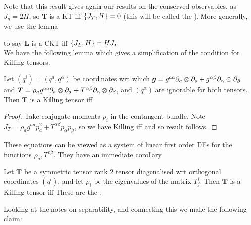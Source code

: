 \documentclass{article}
\begin{document}
Note that this result gives again our results on the conserved observables, as $J_g = 2H$, so $\bm{T}$ is a KT iff $\acomm[J_T]{H} = 0$ (this will be called the ). More generally, we use the lemma 
\begin{lemma}
\end{lemma}
to say $\bm{L}$ is a CKT iff $\acomm[J_L]{H}=  H J_{\bar{L}}$ \\
We have the following lemma which gives a simplification of the condition for Killing tensors.

\begin{lemma}
Let $(q^i) = (q^a, q^\alpha)$ be coordinates wrt which $\bm{g} = g^{aa} \del_a \otimes \del_a + g^{\alpha\beta} \del_\alpha \otimes \del_\beta$ and $\bm{T} = \rho_a g^{aa} \del_a \otimes \del_a + T^{\alpha\beta} \del_\alpha \otimes \del_\beta$, and $(q^\alpha)$ are ignorable for both tensors. Then $\bm{T}$ is a Killing tensor iff
\end{lemma}
\begin{proof}
Take conjugate momenta $p_i$ in the contangent bundle. Note $J_T =  \rho_a g^{aa} p_a^2 + T^{\alpha\beta}p_\alpha p_\beta$, so we have Killing iff
and so result follows. 
\end{proof}
These equations can be viewed as a system of linear first order DEs for the functions $\rho_a, T^{\alpha\beta}$. They have an immediate corollary
\begin{corollary}
Let $\bm{T}$ be a symmetric tensor rank 2 tensor diagonalised wrt orthogonal coordinates $(q^i)$, and let $\rho_i$ be the eigenvalues of the matrix $T^i_j$. Then $\bm{T}$ is a Killing tensor iff 
These are the .
\end{corollary}
Looking at the notes on separability, and connecting this we make the following claim:
\end{document}
